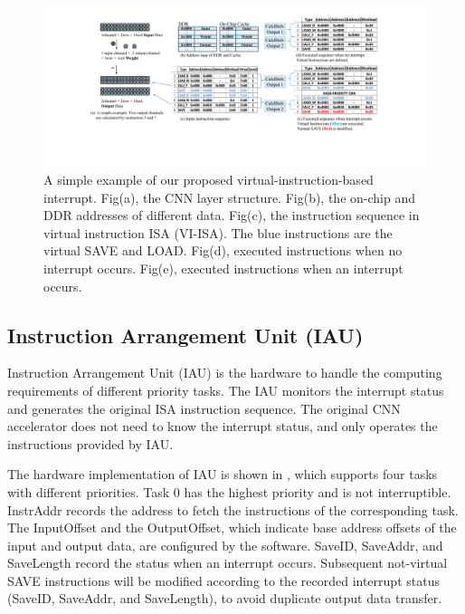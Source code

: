 \begin{figure}[t]
	\centering
	\includegraphics[width=0.9\linewidth]{fig/interexample.pdf}
	\vspace{-5mm}
	\caption{ A simple example of our proposed virtual-instruction-based interrupt. Fig(a), the CNN layer structure. Fig(b), the on-chip and DDR addresses of different data. Fig(c), the instruction sequence in virtual instruction ISA (VI-ISA). The blue instructions are the virtual SAVE and LOAD. Fig(d), executed instructions when no interrupt occurs. Fig(e), executed instructions when an interrupt occurs. }
	\label{fig:interexample}
\end{figure}


\subsection{ Instruction Arrangement Unit (IAU) }

Instruction Arrangement Unit (IAU) is the hardware to handle the computing requirements of different priority tasks. The IAU monitors the interrupt status and generates the original ISA instruction sequence. The original CNN accelerator does not need to know the interrupt status, and only operates the instructions provided by IAU.

The hardware implementation of IAU is shown in , which supports four tasks with different priorities. Task 0 has the highest priority and is not interruptible. 
InstrAddr records the address to fetch the instructions of the corresponding task. The InputOffset and the OutputOffset, which indicate base address offsets of the input and output data, are configured by the software. 
SaveID, SaveAddr, and SaveLength record the status when an interrupt occurs. 
Subsequent not-virtual SAVE instructions will be modified according to the recorded interrupt status (SaveID, SaveAddr, and SaveLength), to avoid duplicate output data transfer.

